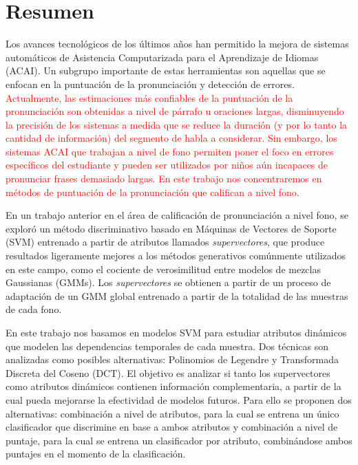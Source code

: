 \chapter*{Resumen}

Los avances tecnológicos de los últimos años han permitido la mejora de sistemas
automáticos de Asistencia Computarizada para el Aprendizaje de Idiomas (ACAI).
Un subgrupo importante de estas herramientas son aquellas que se enfocan en la
puntuación de la pronunciación y detección de errores.
\textcolor{red}{
Actualmente, las estimaciones más confiables de la puntuación de la pronunciación
son obtenidas a nivel de párrafo u oraciones largas, disminuyendo la precisión
de los sistemas a medida que se reduce la duración
(y por lo tanto la cantidad de información) del segmento de habla a considerar.
Sin embargo, los sistemas ACAI que trabajan a nivel de fono
permiten poner el foco en errores específicos del estudiante y
pueden ser utilizados por niños aún incapaces de pronunciar frases
demasiado largas.
En este trabajo nos concentraremos en métodos de puntuación de la pronunciación
que califican a nivel fono.
}


En un trabajo anterior en el área de calificación de pronunciación a nivel fono,
se exploró
un método discriminativo basado en Máquinas de Vectores de Soporte (SVM) entrenado
a partir de atributos llamados \textit{supervectores},
que produce resultados ligeramente mejores a los métodos
generativos comúnmente utilizados en este campo, como el cociente de verosimilitud
entre modelos de mezclas Gaussianas (GMMs). Los \textit{supervectores} se obtienen a partir de
un proceso de adaptación de un GMM global entrenado a partir de la totalidad
de las muestras de cada fono.

En este trabajo nos basamos en modelos SVM para
estudiar atributos dinámicos que modelen las dependencias
temporales de cada muestra. Dos técnicas son analizadas como posibles alternativas:
Polinomios de Legendre y Transformada Discreta del Coseno (DCT).
El objetivo
es analizar si tanto los supervectores como atributos dinámicos
contienen información complementaria,
a partir de la cual pueda mejorarse la efectividad de modelos futuros.
Para ello
se proponen dos alternativas: combinación a nivel de atributos,
para la cual se entrena un único clasificador que discrimine en base a ambos atributos
y combinación a nivel de puntaje,
para la cual se entrena un clasificador por atributo, combinándose ambos puntajes
en el momento de la clasificación.

